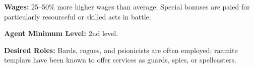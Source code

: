 

\textbf{Wages:} 25--50\% more higher wages than average. Special bonuses are paied for particularly resourceful or skilled acts in battle.

\textbf{Agent Minimum Level:} 2nd level.

\textbf{Desired Roles:} Bards, rogues, and psionicists are often employed; raamite templars have been known to offer services as guards, spies, or spellcasters.